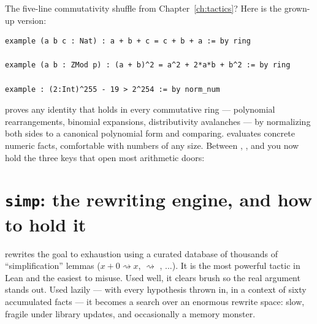 The five-line commutativity shuffle from Chapter~\ref{ch:tactics}? Here is
the grown-up version:

\begin{lstlisting}[language=Lean]
example (a b c : Nat) : a + b + c = c + b + a := by ring

example (a b : ZMod p) : (a + b)^2 = a^2 + 2*a*b + b^2 := by ring

example : (2:Int)^255 - 19 > 2^254 := by norm_num
\end{lstlisting}

 proves any identity that holds in every commutative ring ---
polynomial rearrangements, binomial expansions, distributivity avalanches ---
by normalizing both sides to a canonical polynomial form and comparing.
 evaluates concrete numeric facts, comfortable with numbers of
any size. Between , , and  you now hold
the three keys that open most arithmetic doors:

\begin{center}
\end{center}

\section{\texttt{simp}: the rewriting engine, and how to hold it}

 rewrites the goal to exhaustion using a curated database of
thousands of ``simplification'' lemmas ($x + 0 \rightsquigarrow x$,
 $\rightsquigarrow$ , ...). It
is the most powerful tactic in Lean and the easiest to misuse. Used well, it
clears brush so the real argument stands out. Used lazily ---
 with every hypothesis thrown in, in a context of sixty
accumulated facts --- it becomes a search over an enormous rewrite space:
slow, fragile under library updates, and occasionally a memory monster.

